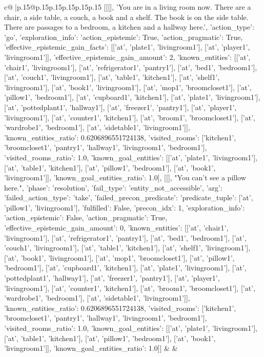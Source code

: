 \documentclass{article}
\begin{document}
{\begin{supertabular}{c@{$\;$}|p{.15\linewidth}@{}p{.15\linewidth}p{.15\linewidth}p{.15\linewidth}p{.15\linewidth}p{.15\linewidth}}
{{{	 [[[], 'You are in a living room now. There are a chair, a side table, a couch, a book and a shelf. The book is on the side table. There are passages to a bedroom, a kitchen and a hallway here.', {'action_type': 'go', 'exploration_info': {'action_epistemic': True, 'action_pragmatic': True, 'effective_epistemic_gain_facts': [['at', 'plate1', 'livingroom1'], ['at', 'player1', 'livingroom1']], 'effective_epistemic_gain_amount': 2, 'known_entities': [['at', 'chair1', 'livingroom1'], ['at', 'refrigerator1', 'pantry1'], ['at', 'bed1', 'bedroom1'], ['at', 'couch1', 'livingroom1'], ['at', 'table1', 'kitchen1'], ['at', 'shelf1', 'livingroom1'], ['at', 'book1', 'livingroom1'], ['at', 'mop1', 'broomcloset1'], ['at', 'pillow1', 'bedroom1'], ['at', 'cupboard1', 'kitchen1'], ['at', 'plate1', 'livingroom1'], ['at', 'pottedplant1', 'hallway1'], ['at', 'freezer1', 'pantry1'], ['at', 'player1', 'livingroom1'], ['at', 'counter1', 'kitchen1'], ['at', 'broom1', 'broomcloset1'], ['at', 'wardrobe1', 'bedroom1'], ['at', 'sidetable1', 'livingroom1']], 'known_entities_ratio': 0.6206896551724138, 'visited_rooms': ['kitchen1', 'broomcloset1', 'pantry1', 'hallway1', 'livingroom1', 'bedroom1'], 'visited_rooms_ratio': 1.0, 'known_goal_entities': [['at', 'plate1', 'livingroom1'], ['at', 'table1', 'kitchen1'], ['at', 'pillow1', 'bedroom1'], ['at', 'book1', 'livingroom1']], 'known_goal_entities_ratio': 1.0}}], [[], "You can't see a pillow here.", {'phase': 'resolution', 'fail_type': 'entity_not_accessible', 'arg': {'failed_action_type': 'take', 'failed_precon_predicate': {'predicate_tuple': ['at', 'pillow1', 'livingroom1'], 'fulfilled': False, 'precon_idx': 1}}, 'exploration_info': {'action_epistemic': False, 'action_pragmatic': True, 'effective_epistemic_gain_amount': 0, 'known_entities': [['at', 'chair1', 'livingroom1'], ['at', 'refrigerator1', 'pantry1'], ['at', 'bed1', 'bedroom1'], ['at', 'couch1', 'livingroom1'], ['at', 'table1', 'kitchen1'], ['at', 'shelf1', 'livingroom1'], ['at', 'book1', 'livingroom1'], ['at', 'mop1', 'broomcloset1'], ['at', 'pillow1', 'bedroom1'], ['at', 'cupboard1', 'kitchen1'], ['at', 'plate1', 'livingroom1'], ['at', 'pottedplant1', 'hallway1'], ['at', 'freezer1', 'pantry1'], ['at', 'player1', 'livingroom1'], ['at', 'counter1', 'kitchen1'], ['at', 'broom1', 'broomcloset1'], ['at', 'wardrobe1', 'bedroom1'], ['at', 'sidetable1', 'livingroom1']], 'known_entities_ratio': 0.6206896551724138, 'visited_rooms': ['kitchen1', 'broomcloset1', 'pantry1', 'hallway1', 'livingroom1', 'bedroom1'], 'visited_rooms_ratio': 1.0, 'known_goal_entities': [['at', 'plate1', 'livingroom1'], ['at', 'table1', 'kitchen1'], ['at', 'pillow1', 'bedroom1'], ['at', 'book1', 'livingroom1']], 'known_goal_entities_ratio': 1.0}}]] 
	  } 
	   } 
	   } 
	 & & \\ 
 


\end{supertabular}}
\end{document}
